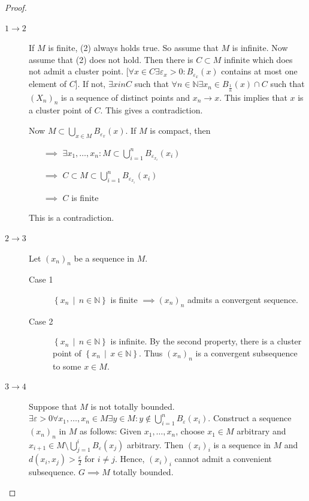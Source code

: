 \documentclass{article}
\numberwithin{lecref}{section}
\newcommand{\SetDef}[2]{\left\{#1\,\mid\,#2\right\}}
\begin{document}
\begin{proof}
	\begin{description}
		\item[$1 \to 2$]
			If $M$ is finite, (2) always holds true.
			So assume that $M$ is infinite. Now assume that (2) does not hold.
			Then there is $C \subset M$ infinite which does not admit a cluster point.
			[$\forall x \in C \exists \varepsilon_x > 0: B_{\varepsilon_x}(x)$ contains at most one element of $C$].
			If not, $\exists x in C$ such that $\forall n \in \mathbb N \exists x_n \in B_{\frac1n}(x) \cap C$ such that $(X_n)_n$ is a sequence of distinct points and $x_n \to x$.
			This implies that $x$ is a cluster point of $C$. This gives a contradiction.

			Now $M \subset \bigcup_{x \in M} B_{\varepsilon_x}(x)$. If $M$ is compact, then
			\begin{enumerate}
				\item[$\implies$] $\exists x_1, \dots, x_n: M \subset \bigcup_{i=1}^n B_{\varepsilon_{x_i}}(x_i)$
				\item[$\implies$] $C \subset M \subset \bigcup_{i=1}^n B_{\varepsilon_{x_i}}(x_i)$
				\item[$\implies$] $C$ is finite
			\end{enumerate}
			This is a contradiction.
		\item[$2 \to 3$]
			Let $(x_n)_n$ be a sequence in $M$.
			\begin{description}
				\item[Case 1]
					$\SetDef{x_n}{n \in \mathbb N}$ is finite $\implies (x_n)_n$ admits a convergent sequence.
				\item[Case 2]
					$\SetDef{x_n}{n \in \mathbb N}$ is infinite.
					By the second property, there is a cluster point of $\SetDef{x_n}{x \in \mathbb N}$.
					Thus $(x_n)_n$ is a convergent subsequence to some $x \in M$.
			\end{description}
		\item[$3 \to 4$]
			Suppose that $M$ is not totally bounded. $\exists \varepsilon > 0 \forall x_1, \dots, x_n \in M \exists y \in M: y \not\in \bigcup_{i = 1}^n B_{\varepsilon}(x_i)$.
			Construct a sequence $(x_n)_n$ in $M$ as follows:
			Given $x_1, \dots, x_n$, choose $x_1 \in M$ arbitrary and $x_{i+1} \in M \setminus \bigcup_{j=1}^i B_{\varepsilon}(x_j)$ arbitrary.
			Then $(x_i)_i$ is a sequence in $M$ and $d(x_i, x_j) > \frac\varepsilon2$ for $i \neq j$.
			Hence, $(x_i)_i$ cannot admit a convenient subsequence. $G \implies M$ totally bounded.


\end{description}
\end{proof}
\end{document}
